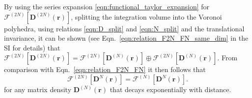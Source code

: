 \documentclass[journal=jpclcd,manuscript=letter]{achemso}
\DeclareMathOperator{\tr}{tr}
\newcommand\m[1]{\mathbf{#1}}
\renewcommand\vec[1]{\mathbf{#1}}
\begin{document}
By using the series expansion \ref{eqn:functional_taylor_expansion} for $\m{\mathcal{F}}^{(2N)}[\m{D}^{(2N)}(\vec{r})]$,
splitting the integration volume into the Voronoi polyhedra, using relations \ref{eqn:D_split} and \ref{eqn:N_split}
and the translational invariance,
it can be shown (see Eqn.~\ref{eqn:relation_F2N_FN_same_dim} in the SI for details) that
$\m{\mathcal{F}}^{(2N)}[\m{D}^{(2N)}(\vec{r})] = \m{\mathcal{F}}^{(2N)}[\m{D}^{(N)}(\vec{r})] \oplus \m{\mathcal{F}}^{(2N)}[\m{D}^{(N)}(\vec{r})]$. From comparison with Eqn.~\ref{eqn:relation_F2N_FN} it then follows that
\begin{equation}
  \m{\mathcal{F}}^{(2N)}[\m{D}^{N}(\vec{r})] = \m{\mathcal{F}}^{(N)}[\m{D}^{N}(\vec{r})].
\end{equation}
for any matrix density $\m{D}^{(N)}(\vec{r})$ that decays exponentially with distance.
\end{document}
